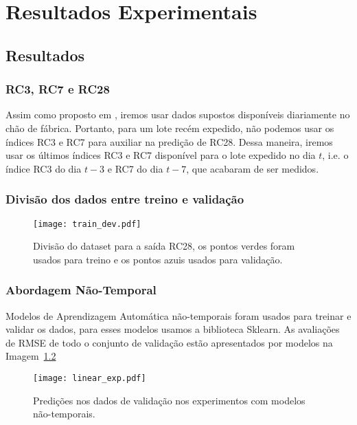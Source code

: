 \chapter{Resultados Experimentais }
\label{cap:resultados}

\section{Resultados}


\subsection{RC3, RC7 e RC28}

Assim como proposto em \cite{grecialin}, iremos usar dados supostos disponíveis diariamente no chão de fábrica. Portanto, para um lote recém expedido,
não podemos usar os índices RC3 e RC7 para auxiliar na predição de RC28. Dessa maneira, iremos usar os últimos índices RC3 e RC7 disponível para o lote expedido no dia $t$,
i.e. o índice RC3 do dia $t-3$ e RC7 do dia $t-7$, que acabaram de ser medidos. 

\subsection{Divisão dos dados entre treino e validação}

\begin{figure}[H]
  \centering
  \texttt{[image: train\_dev.pdf]}
  \caption{Divisão do dataset para a saída RC28, os pontos verdes foram usados para
    treino e os pontos azuis usados para validação.}
  \label{fig:divrc28}
\end{figure}

\subsection{Abordagem Não-Temporal}

Modelos de Aprendizagem Automática não-temporais foram usados para treinar e validar os dados, para esses modelos usamos a biblioteca Sklearn.
As avaliações de RMSE de todo o conjunto de validação estão apresentados por modelos na Imagem~\ref{fig:linmodels}  

\begin{figure}[H]
  \centering
  \label{fig:linmodels}
\texttt{[image: linear\_exp.pdf]}
\caption{Predições nos dados de validação nos experimentos com modelos não-temporais. }
\end{figure}

